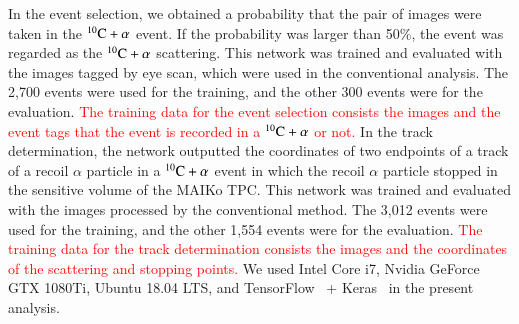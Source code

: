\documentclass{jps-cp}
\begin{document}
In the event selection, we obtained a probability that the pair of images were taken
in the ${}^{10}\rm{C}+\alpha$ event.
If the probability was larger than 50\%, the event was regarded as the ${}^{10}\rm{C}+\alpha$ scattering.
This network was trained and evaluated with the images tagged by eye scan,
which were used in the conventional analysis.
The 2,700 events were used for the training, and the other 300 events were for the evaluation.
\textcolor{red}{The training data for the event selection consists the images and the event tags that the event is recorded in a ${}^{10}\rm{C}+\alpha$ or not.}
In the track determination, the network outputted the coordinates of two endpoints of
a track of a recoil $\alpha$ particle in a ${}^{10}\rm{C}+\alpha$ event in which the recoil $\alpha$ particle stopped
in the sensitive volume of the MAIKo TPC.
This network was trained and evaluated with the images processed by the conventional method.
The 3,012 events were used for the training, and the other 1,554 events were for the evaluation.
\textcolor{red}{The training data for the track determination consists the images and the coordinates of the scattering and stopping points.}
We used Intel Core i7, Nvidia GeForce GTX 1080Ti, Ubuntu 18.04 LTS, and
TensorFlow~\cite{tensorflow} + Keras~\cite{keras} in the present analysis.
\end{document}
